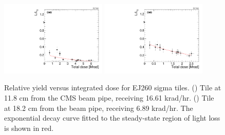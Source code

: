 \begin{figure}[tbp!]
\centering
\includegraphics[width=0.45\textwidth]{figures/EJ260-S-11p8cm-f8ch2-dose.pdf}
\includegraphics[width=0.45\textwidth]{figures/EJ260-S-18p2cm-f3ch1-dose.pdf}
\caption{Relative yield versus integrated dose for EJ260 sigma tiles. (\cmsLeft) Tile at 11.8 cm from the CMS beam pipe, receiving 16.61 krad/hr. (\cmsRight) Tile at 18.2 cm from the beam pipe, receiving 6.89 krad/hr. The exponential decay curve fitted to the steady-state region of light loss is shown in red.}
\label{fig:EJ260-S-dose}
\end{figure} 

